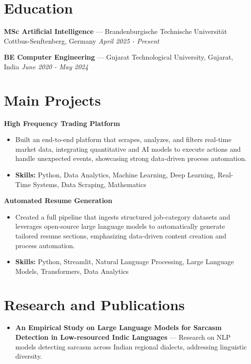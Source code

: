 \documentclass[a4paper,10pt]{article}
\begin{document}
\section*{Education}
\textbf{MSc Artificial Intelligence} — Brandenburgische Technische Universität Cottbus-Senftenberg, Germany \hfill \textit{April 2025 - Present}\par
\vspace{1.5pt}
\textbf{BE Computer Engineering} — Gujarat Technological University, Gujarat, India \hfill \textit{June 2020 - May 2024}\par

\section*{Main Projects}
\textbf{High Frequency Trading Platform}\par
\vspace{1pt}
\begin{itemize}
  \item Built an end-to-end platform that scrapes, analyzes, and filters real-time market data, integrating quantitative and AI models to execute actions and handle unexpected events, showcasing strong data-driven process automation.
  \item \textbf{Skills:} Python, Data Analytics, Machine Learning, Deep Learning, Real-Time Systems, Data Scraping, Mathematics
\end{itemize}
\vspace{3pt}
\textbf{Automated Resume Generation}\par
\vspace{1pt}
\begin{itemize}
  \item Created a full pipeline that ingests structured job-category datasets and leverages open-source large language models to automatically generate tailored resume sections, emphasizing data-driven content creation and process automation.
  \item \textbf{Skills:} Python, Streamlit, Natural Language Processing, Large Language Models, Transformers, Data Analytics
\end{itemize}

\section*{Research and Publications}
\begin{itemize}
\item \textbf{An Empirical Study on Large Language Models for Sarcasm Detection in Low-resourced Indic Languages} — Research on NLP models detecting sarcasm across Indian regional dialects, addressing linguistic diversity.
\end{itemize}
\end{document}
